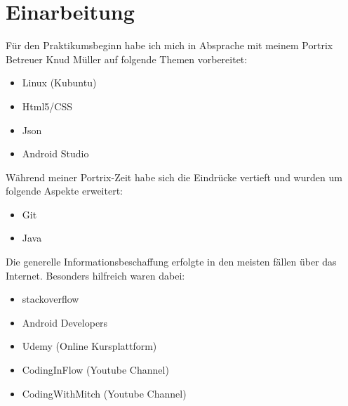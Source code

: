 \newpage
\chapter{Einarbeitung}
F\"ur den Praktikumsbeginn habe ich mich in Absprache mit meinem Portrix Betreuer Knud M\"uller auf folgende Themen vorbereitet:
\begin{itemize}
\item Linux (Kubuntu)
\item Html5/CSS
\item Json
\item Android Studio
\end{itemize}

W\"ahrend meiner Portrix-Zeit habe sich die Eindr\"ucke vertieft und wurden um folgende Aspekte erweitert:

\begin{itemize}
\item Git
\item Java
\end{itemize}

Die generelle Informationsbeschaffung erfolgte in den meisten f\"allen \"uber das Internet. Besonders hilfreich waren dabei:

\begin{itemize}
\item stackoverflow
\item Android Developers
\item Udemy (Online Kursplattform)
\item CodingInFlow (Youtube Channel)
\item CodingWithMitch (Youtube Channel)
\end{itemize}


